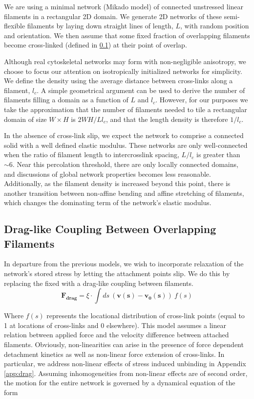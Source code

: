 \documentclass[pre,preprint]{revtex4-1}
\begin{document}
We are using a minimal network (Mikado model) of connected unstressed linear filaments in a rectangular 2D domain.  We generate 2D networks of these semi-flexible filaments by laying down straight lines of length, $L$, with random position and orientation. We then assume that some fixed fraction of overlapping filaments become cross-linked (defined in \ref{exp_drag}) at their point of overlap.

Although real cytoskeletal networks may form with non-negligible anisotropy, we choose to focus our attention on isotropically initialized networks for simplicity.  We define the density using the average distance between cross-links along a filament, $l_c$. A simple geometrical argument can be used to derive the number of filaments filling a domain as a function of $L$ and $l_c$\cite{theo_hlm}.  However, for our purposes we take the approximation that the number of filaments needed to tile a rectangular domain of size $W \times H$  is $2WH/Ll_c$, and that the length density is therefore $1/l_c$. 

In the absence of cross-link slip, we expect the network to comprise a connected solid with a well defined elastic modulus\cite{theo_hlm,theo_hlm2}.  These networks are only well-connected when the ratio of filament length to intercrosslink spacing, $L/l_c$ is greater than $\sim 6$.  Near this percolation threshold, there are only locally connected domains, and discussions of global network properties becomes less reasonable.  Additionally, as the filament density is increased beyond this point, there is another transition between non-affine bending and affine stretching of filaments, which changes the dominating term of the network's elastic modulus.



\subsection{Drag-like Coupling Between Overlapping Filaments}
\label{exp_drag}
In departure from the previous models, we wish to incorporate relaxation of the network's stored stress by letting the attachment points slip.  We do this by replacing the fixed with a drag-like coupling between filaments.
\begin{equation}
\mathbf{F_{drag}} = \xi \cdot \int ds \: (\mathbf{v(s)}-\mathbf{v_0(s)}) \: f(s)
\end{equation}

Where $f(s)$ represents the locational distribution of cross-link points (equal to 1 at locations of cross-links and 0 elsewhere).  This model assumes a linear relation between applied force and the velocity difference between attached filaments.  Obviously, non-linearities can arise in the presence of force dependent detachment kinetics as well as non-linear force extension of cross-links.  In particular, we address non-linear effects of stress induced unbinding in Appendix \ref{app:drag}.  Assuming inhomogeneities from non-linear effects are of second order, the motion for the entire network is governed by a dynamical equation of the form
\end{document}
